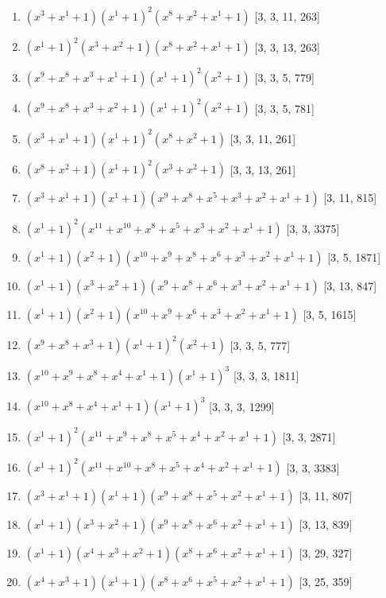 \documentclass[10pt,twocolumn]{article}
\begin{document}
\begin{enumerate}
\item $(x^{3} + x^{1} + 1)(x^{1} + 1)^{2}(x^{8} + x^{2} + x^{1} + 1)$  [3, 3, 11, 263]
\item $(x^{1} + 1)^{2}(x^{3} + x^{2} + 1)(x^{8} + x^{2} + x^{1} + 1)$  [3, 3, 13, 263]
\item $(x^{9} + x^{8} + x^{3} + x^{1} + 1)(x^{1} + 1)^{2}(x^{2} + 1)$  [3, 3, 5, 779]
\item $(x^{9} + x^{8} + x^{3} + x^{2} + 1)(x^{1} + 1)^{2}(x^{2} + 1)$  [3, 3, 5, 781]
\item $(x^{3} + x^{1} + 1)(x^{1} + 1)^{2}(x^{8} + x^{2} + 1)$  [3, 3, 11, 261]
\item $(x^{8} + x^{2} + 1)(x^{1} + 1)^{2}(x^{3} + x^{2} + 1)$  [3, 3, 13, 261]
\item $(x^{3} + x^{1} + 1)(x^{1} + 1)(x^{9} + x^{8} + x^{5} + x^{3} + x^{2} + x^{1} + 1)$  [3, 11, 815]
\item $(x^{1} + 1)^{2}(x^{11} + x^{10} + x^{8} + x^{5} + x^{3} + x^{2} + x^{1} + 1)$  [3, 3, 3375]
\item $(x^{1} + 1)(x^{2} + 1)(x^{10} + x^{9} + x^{8} + x^{6} + x^{3} + x^{2} + x^{1} + 1)$  [3, 5, 1871]
\item $(x^{1} + 1)(x^{3} + x^{2} + 1)(x^{9} + x^{8} + x^{6} + x^{3} + x^{2} + x^{1} + 1)$  [3, 13, 847]
\item $(x^{1} + 1)(x^{2} + 1)(x^{10} + x^{9} + x^{6} + x^{3} + x^{2} + x^{1} + 1)$  [3, 5, 1615]
\item $(x^{9} + x^{8} + x^{3} + 1)(x^{1} + 1)^{2}(x^{2} + 1)$  [3, 3, 5, 777]
\item $(x^{10} + x^{9} + x^{8} + x^{4} + x^{1} + 1)(x^{1} + 1)^{3}$  [3, 3, 3, 1811]
\item $(x^{10} + x^{8} + x^{4} + x^{1} + 1)(x^{1} + 1)^{3}$  [3, 3, 3, 1299]
\item $(x^{1} + 1)^{2}(x^{11} + x^{9} + x^{8} + x^{5} + x^{4} + x^{2} + x^{1} + 1)$  [3, 3, 2871]
\item $(x^{1} + 1)^{2}(x^{11} + x^{10} + x^{8} + x^{5} + x^{4} + x^{2} + x^{1} + 1)$  [3, 3, 3383]
\item $(x^{3} + x^{1} + 1)(x^{1} + 1)(x^{9} + x^{8} + x^{5} + x^{2} + x^{1} + 1)$  [3, 11, 807]
\item $(x^{1} + 1)(x^{3} + x^{2} + 1)(x^{9} + x^{8} + x^{6} + x^{2} + x^{1} + 1)$  [3, 13, 839]
\item $(x^{1} + 1)(x^{4} + x^{3} + x^{2} + 1)(x^{8} + x^{6} + x^{2} + x^{1} + 1)$  [3, 29, 327]
\item $(x^{4} + x^{3} + 1)(x^{1} + 1)(x^{8} + x^{6} + x^{5} + x^{2} + x^{1} + 1)$  [3, 25, 359]

\end{enumerate}
\end{document}
